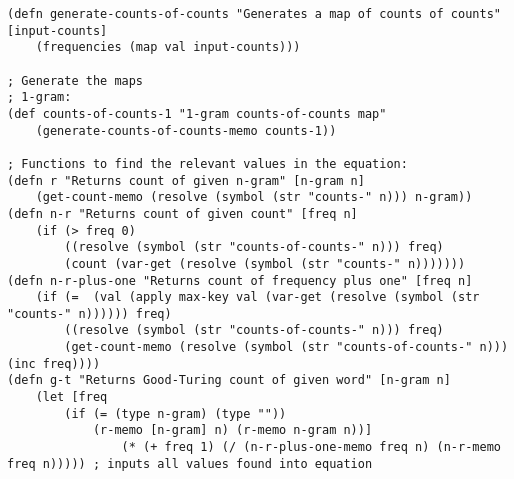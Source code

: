 \begin{lstlisting}
(defn generate-counts-of-counts "Generates a map of counts of counts" [input-counts] 
	(frequencies (map val input-counts))) 

; Generate the maps
; 1-gram:
(def counts-of-counts-1 "1-gram counts-of-counts map" 
	(generate-counts-of-counts-memo counts-1))

; Functions to find the relevant values in the equation:
(defn r "Returns count of given n-gram" [n-gram n] 
	(get-count-memo (resolve (symbol (str "counts-" n))) n-gram)) 
(defn n-r "Returns count of given count" [freq n] 
	(if (> freq 0) 
		((resolve (symbol (str "counts-of-counts-" n))) freq)
		(count (var-get (resolve (symbol (str "counts-" n)))))))
(defn n-r-plus-one "Returns count of frequency plus one" [freq n] 
	(if (=  (val (apply max-key val (var-get (resolve (symbol (str "counts-" n)))))) freq)
		((resolve (symbol (str "counts-of-counts-" n))) freq) 
		(get-count-memo (resolve (symbol (str "counts-of-counts-" n))) (inc freq))))
(defn g-t "Returns Good-Turing count of given word" [n-gram n] 
	(let [freq 
		(if (= (type n-gram) (type "")) 
			(r-memo [n-gram] n) (r-memo n-gram n))]
				(* (+ freq 1) (/ (n-r-plus-one-memo freq n) (n-r-memo freq n))))) ; inputs all values found into equation
\end{lstlisting}





